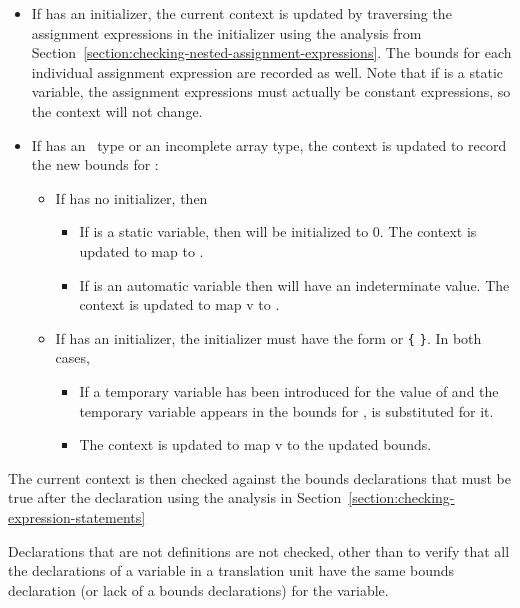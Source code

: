 \begin{itemize}
\item
  If  has an initializer, the current context is updated by
  traversing the assignment expressions in the initializer using the
  analysis from Section~\ref{section:checking-nested-assignment-expressions}. 
  The bounds for each individual assignment
  expression are recorded as well. Note that if  is a static
  variable, the assignment expressions must actually be constant
  expressions, so the context will not change.
\item
  If  has an \arrayptr\ type or an incomplete array
  type, the context is updated to record the new bounds for :

  \begin{itemize}
  \item
    If  has no initializer, then

    \begin{itemize}
    \item
      If  is a static variable, then  will be
      initialized to 0. The context is updated to map  to
      \boundsany.
    \item
      If  is an automatic variable then  will have an
      indeterminate value. The context is updated to map v to
      \boundsunknown.
    \end{itemize}
  \item
    If  has an initializer, the initializer must have the form
     or \lstinline|{|  \lstinline|}|. In both cases,

    \begin{itemize}
    \item
      If a temporary variable has been introduced for the value 
      of  and the temporary variable appears in the bounds for
      ,  is substituted for it.
    \item
      The context is updated to map v to the updated bounds.
    \end{itemize}
  \end{itemize}
\end{itemize}

The current context is then checked against the bounds declarations that
must be true after the declaration using the analysis in 
Section~\ref{section:checking-expression-statements}

Declarations that are not definitions are not checked, other than to
verify that all the declarations of a variable in a translation unit
have the same bounds declaration (or lack of a bounds declarations) for
the variable.

